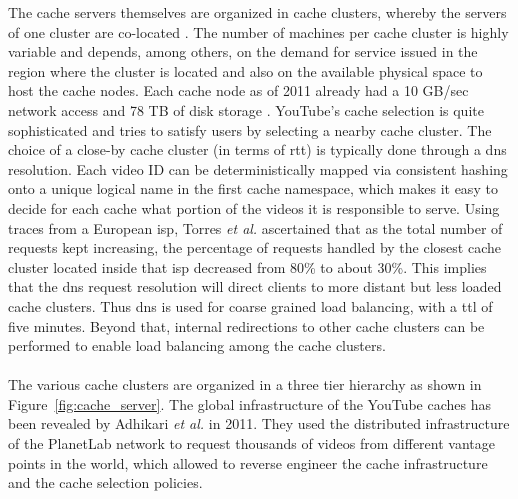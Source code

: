 The cache servers themselves are organized in cache clusters, whereby the servers of one cluster are co-located \cite{inc:video_delivery}. The number of machines per cache cluster is highly variable and depends, among others, on the demand for service issued in the region where the cluster is located and also on the available physical space to host the cache nodes. Each cache node as of 2011 already had a 10 GB/sec network access and 78 TB of disk storage \cite{misc:mmsys_keynote}. YouTube's cache selection is quite sophisticated and tries to satisfy users by selecting a nearby cache cluster. The choice of a close-by cache cluster (in terms of \gls{rtt}) is typically done through a \gls{dns} resolution. Each video ID can be deterministically mapped via consistent hashing onto a unique logical name in the first cache namespace, which makes it easy to decide for each cache what portion of the videos it is responsible to serve. Using traces from a European \gls{isp}, Torres \emph{et al.} \cite{inpr:server_selection} ascertained that as the total number of requests kept increasing, the percentage of requests handled by the closest cache cluster located inside that \gls{isp} decreased from 80\% to about 30\%. This implies that the \gls{dns} request resolution will direct clients to more distant but less loaded cache clusters. Thus \gls{dns} is used for coarse grained load balancing, with a \gls{ttl} of five minutes. Beyond that, internal redirections to other cache clusters can be performed to enable load balancing among the cache clusters.
\\
\\
The various cache clusters are organized in a three tier hierarchy as shown in Figure~\vref{fig:cache_server}. The global infrastructure of the YouTube caches has been revealed by Adhikari \emph{et al.} \cite{inpr:vivisecting_youtube} in 2011. They used the distributed infrastructure of the PlanetLab network to request thousands of videos from different vantage points in the world, which allowed to reverse engineer the cache infrastructure and the cache selection policies. \\

